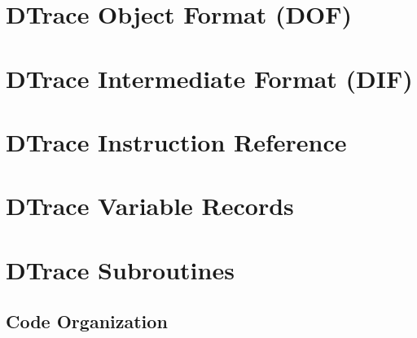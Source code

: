 \chapter{DTrace Object Format (DOF)}
\label{chap:dtrace-object-format}


\chapter{DTrace Intermediate Format (DIF)}
\label{chap:dtrace-intermediate-format}


\chapter{DTrace Instruction Reference}
\label{chap:dtrace-instruction-reference}


\chapter{DTrace Variable Records}
\label{chap:dtrace-variable-records}


\chapter{DTrace Subroutines}
\label{chap:dtrace-subroutines}


\begin{appendices}
\chapter{Code Organization}
\label{chap:dtrace-code}


\end{appendices}






